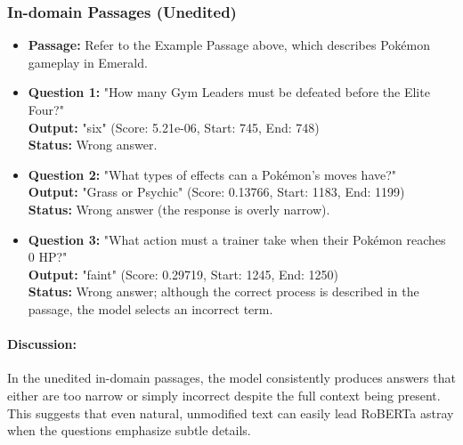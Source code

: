 \documentclass[11pt]{article}
\begin{document}
\subsubsection{In-domain Passages (Unedited)}
\begin{itemize}
    \item \textbf{Passage:} Refer to the Example Passage above, which describes Pokémon gameplay in Emerald.
    \item \textbf{Question 1:} "How many Gym Leaders must be defeated before the Elite Four?" \\
          \textbf{Output:} "six" (Score: 5.21e-06, Start: 745, End: 748) \\
          \textbf{Status:} Wrong answer.
    \item \textbf{Question 2:} "What types of effects can a Pokémon's moves have?" \\
          \textbf{Output:} "Grass or Psychic" (Score: 0.13766, Start: 1183, End: 1199) \\
          \textbf{Status:} Wrong answer (the response is overly narrow).
    \item \textbf{Question 3:} "What action must a trainer take when their Pokémon reaches 0 HP?" \\
          \textbf{Output:} "faint" (Score: 0.29719, Start: 1245, End: 1250) \\
          \textbf{Status:} Wrong answer; although the correct process is described in the passage, the model selects an incorrect term.
\end{itemize}
\paragraph{Discussion:} In the unedited in-domain passages, the model consistently produces answers that either are too narrow or simply incorrect despite the full context being present. This suggests that even natural, unmodified text can easily lead RoBERTa astray when the questions emphasize subtle details.
\end{document}
